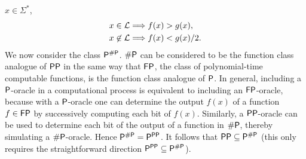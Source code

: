$x\in\Sigma^*$,
\begin{align*}
x\in\mathcal{L}&\Longrightarrow f(x)>g(x), \\
x\not\in\mathcal{L}&\Longrightarrow f(x)<g(x)/2.
\end{align*}
We now consider the class $\mathsf{P}^{\#\mathsf{P}}$. $\#\mathsf{P}$ can be considered to be 
the function class analogue of $\mathsf{PP}$ in the same way that $\mathsf{FP}$, the 
class of polynomial-time computable functions, is the function class analogue 
of $\mathsf{P}$. In general, including a $\mathsf{P}$-oracle in a computational process is 
equivalent to including an $\mathsf{FP}$-oracle, because with a $\mathsf{P}$-oracle one 
can determine the output $f(x)$ of a function $f\in\mathsf{FP}$ by successively 
computing each bit of $f(x)$. Similarly, a $\mathsf{PP}$-oracle can be used to 
determine each bit of the output of a function in $\#\mathsf{P}$, thereby simulating a 
$\#\mathsf{P}$-oracle. Hence $\mathsf{P}^{\#\mathsf{P}}=\mathsf{P}^{\mathsf{PP}}$. It follows that 
$\mathsf{PP}\subseteq\mathsf{P}^{\#\mathsf{P}}$ (this only requires the straightforward direction
$\mathsf{P}^{\mathsf{PP}}\subseteq\mathsf{P}^{\#\mathsf{P}}$).

